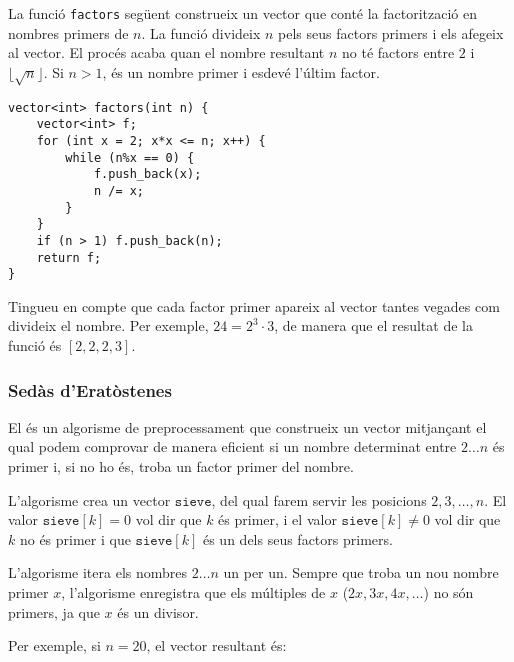 \noindent La funció \texttt{factors} següent construeix un vector que
conté la factorització en nombres primers de $n$. La funció divideix
$n$ pels seus factors primers i els afegeix al vector. El procés acaba
quan el nombre resultant $n$ no té factors entre $2$ i $\lfloor \sqrt
n \rfloor$. Si $n>1$, és un nombre primer i esdevé l'últim factor.


\begin{lstlisting}
vector<int> factors(int n) {
    vector<int> f;
    for (int x = 2; x*x <= n; x++) {
        while (n%x == 0) {
            f.push_back(x);
            n /= x;
        }
    }
    if (n > 1) f.push_back(n);
    return f;
}
\end{lstlisting}


Tingueu en compte que cada factor primer apareix al vector tantes
vegades com divideix el nombre. Per exemple, $24=2^3 \cdot 3$, de
manera que el resultat de la funció és $[2,2,2,3]$.

\subsubsection{Sedàs d'Eratòstenes}


El  %
és un algorisme de preprocessament que construeix un vector
mitjançant el qual podem comprovar de manera eficient si un nombre
determinat entre $2 \ldots n$ és primer i, si no ho és, troba un
factor primer del nombre.

L'algorisme crea un vector $\texttt{sieve}$, del qual farem servir les
posicions $2, 3, \ldots, n$. El valor $\texttt{sieve}[k]=0$ vol dir
que $k$ és primer, i el valor $\texttt{sieve}[k] \neq 0$ vol dir que
$k$ no és primer i que $\texttt{sieve}[k]$ és un dels seus factors
primers.

L'algorisme itera els nombres $2 \ldots n$ un per un. Sempre que troba
un nou nombre primer $x$, l'algorisme enregistra que els múltiples de
$x$ ($2x,3x,4x,\ldots$) no són primers, ja que $x$ és un divisor.

Per exemple, si $n=20$, el vector resultant és:


